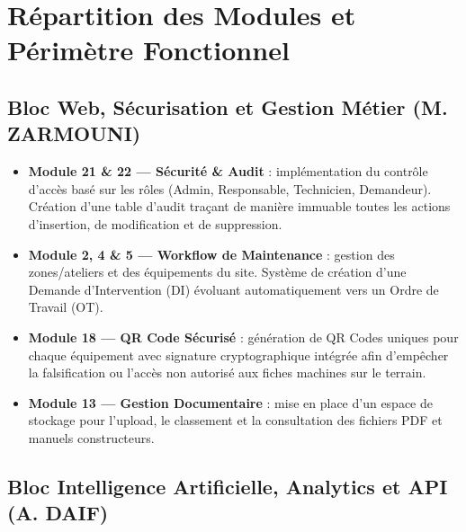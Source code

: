 \documentclass[11pt,a4paper]{article}
\begin{document}
\section{Répartition des Modules et Périmètre Fonctionnel}

\subsection{Bloc Web, Sécurisation et Gestion Métier (M. ZARMOUNI)}

\begin{itemize}
  \item \textbf{Module 21 \& 22 — Sécurité \& Audit} : implémentation du contrôle d'accès basé sur les rôles (Admin, Responsable, Technicien, Demandeur). Création d'une table d'audit traçant de manière immuable toutes les actions d'insertion, de modification et de suppression.
  \item \textbf{Module 2, 4 \& 5 — Workflow de Maintenance} : gestion des zones/ateliers et des équipements du site. Système de création d'une Demande d'Intervention (DI) évoluant automatiquement vers un Ordre de Travail (OT).
  \item \textbf{Module 18 — QR Code Sécurisé} : génération de QR Codes uniques pour chaque équipement avec signature cryptographique intégrée afin d'empêcher la falsification ou l'accès non autorisé aux fiches machines sur le terrain.
  \item \textbf{Module 13 — Gestion Documentaire} : mise en place d'un espace de stockage pour l'upload, le classement et la consultation des fichiers PDF et manuels constructeurs.
\end{itemize}

\subsection{Bloc Intelligence Artificielle, Analytics et API (A. DAIF)}
\end{document}
